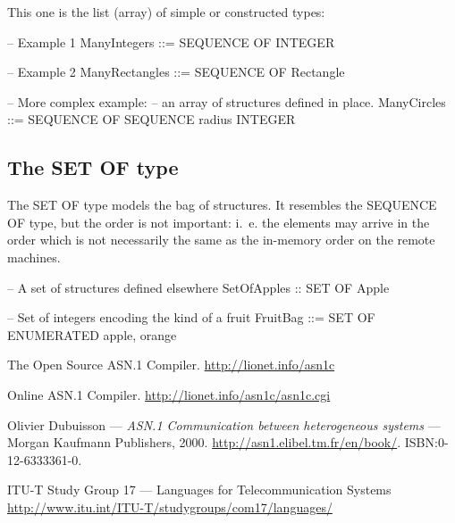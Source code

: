 \documentclass[english,oneside,12pt]{book}
\begin{document}
This one is the list (array) of simple or constructed types:
\begin{asn}
-- Example 1
ManyIntegers ::= SEQUENCE OF INTEGER

-- Example 2
ManyRectangles ::= SEQUENCE OF Rectangle

-- More complex example:
-- an array of structures defined in place.
ManyCircles ::= SEQUENCE OF SEQUENCE {
                            radius INTEGER
                            }
\end{asn}

\subsection{The SET OF type}

The SET OF type models the bag of structures. It resembles the SEQUENCE
OF type, but the order is not important: i.~e. the elements may arrive
in the order which is not necessarily the same as the in-memory order
on the remote machines.
\begin{asn}
-- A set of structures defined elsewhere
SetOfApples :: SET OF Apple

-- Set of integers encoding the kind of a fruit
FruitBag ::= SET OF ENUMERATED { apple, orange }
\end{asn}
\begin{thebibliography}{ITU-T/ASN.1}
The Open Source ASN.1 Compiler. \url{http://lionet.info/asn1c}

Online ASN.1 Compiler. \url{http://lionet.info/asn1c/asn1c.cgi}

Olivier Dubuisson --- \emph{ASN.1 Communication
between heterogeneous systems} --- Morgan Kaufmann Publishers, 2000.
\url{http://asn1.elibel.tm.fr/en/book/}. ISBN:0-12-6333361-0.

ITU-T Study Group 17 --- Languages
for Telecommunication Systems \url{http://www.itu.int/ITU-T/studygroups/com17/languages/}
\end{thebibliography}
\end{document}
